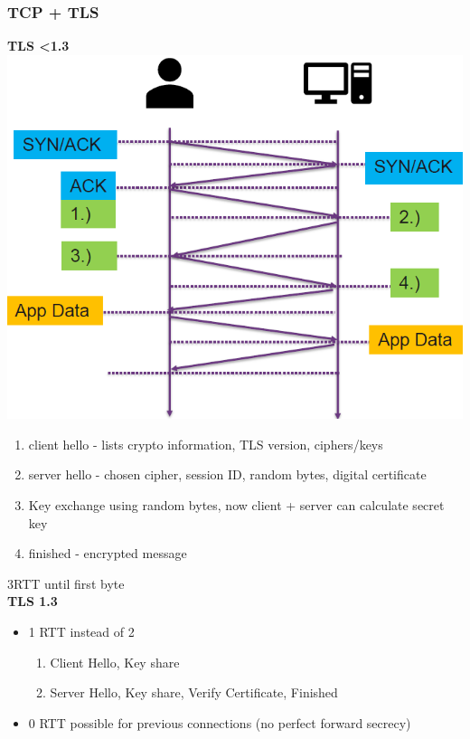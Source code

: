 \subsubsection{TCP + TLS}
\textbf{TLS \textless 1.3}
\includegraphics[width=0.7\linewidth]{img/tcp_tls.png}
\begin{enumerate}
    \item client hello - lists crypto information, TLS version, ciphers/keys
    \item server hello - chosen cipher, session ID, random bytes, digital certificate
    \item Key exchange using random bytes, now client + server can calculate secret key
    \item finished - encrypted message
\end{enumerate}
3RTT until first byte\\
\textbf{TLS 1.3}
\begin{itemize}
    \item 1 RTT instead of 2
    \begin{enumerate}
        \item Client Hello, Key share
        \item Server Hello, Key share, Verify Certificate, Finished
    \end{enumerate}
    \item 0 RTT possible for previous connections (no perfect forward secrecy)
\end{itemize}

